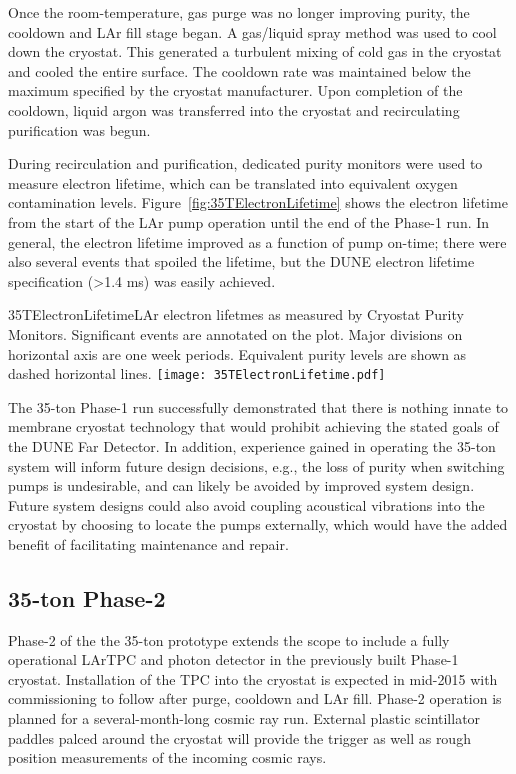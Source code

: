 Once the room-temperature, gas purge was no longer improving purity,
the cooldown and LAr fill stage began.
A gas/liquid spray method was used to cool down the cryostat.
This generated a turbulent mixing of cold gas in the cryostat and cooled the entire surface.
The cooldown rate was maintained below the maximum specified by the cryostat manufacturer.
Upon completion of the cooldown, liquid argon was transferred into the cryostat and recirculating
purification was begun.

During recirculation and purification, dedicated purity monitors were used to measure electron lifetime, which can
be translated into equivalent oxygen contamination levels.
Figure~\ref{fig:35TElectronLifetime} shows the electron lifetime from the start of the
LAr pump operation until the end of the Phase-1 run.
In general, the electron lifetime improved as a function of pump
on-time; there were also several events that spoiled the lifetime, but the DUNE electron lifetime
specification (>1.4 ms) was easily achieved.

\begin{cdrfigure}{35TElectronLifetime}{LAr electron lifetmes as measured by
Cryostat Purity Monitors. Significant events are annotated on the plot. Major divisions on horizontal axis
are one week periods. Equivalent purity levels are shown as dashed horizontal lines.}
\texttt{[image: 35TElectronLifetime.pdf]}
\end{cdrfigure}

The 35-ton Phase-1 run successfully demonstrated that there is nothing innate to
membrane cryostat technology that would prohibit achieving the stated goals of the
DUNE Far Detector. In addition, experience gained in operating the 35-ton system
will inform future design decisions, e.g., the loss of purity when switching pumps is
undesirable, and can likely be avoided by improved system design. Future system
designs could also avoid coupling acoustical vibrations into the cryostat by choosing
to locate the pumps externally, which would have the added benefit of facilitating
maintenance and repair.

\subsection{35-ton Phase-2}
Phase-2 of the the 35-ton prototype extends the scope to include a fully operational LArTPC and
photon detector in the previously built Phase-1 cryostat.
Installation of the TPC into the cryostat is expected in mid-2015 with commissioning to follow
after purge, cooldown and LAr fill.  Phase-2 operation is planned for a several-month-long
cosmic ray run.  External plastic scintillator paddles palced around the cryostat will provide
the trigger as well as rough position measurements of the incoming cosmic rays.

